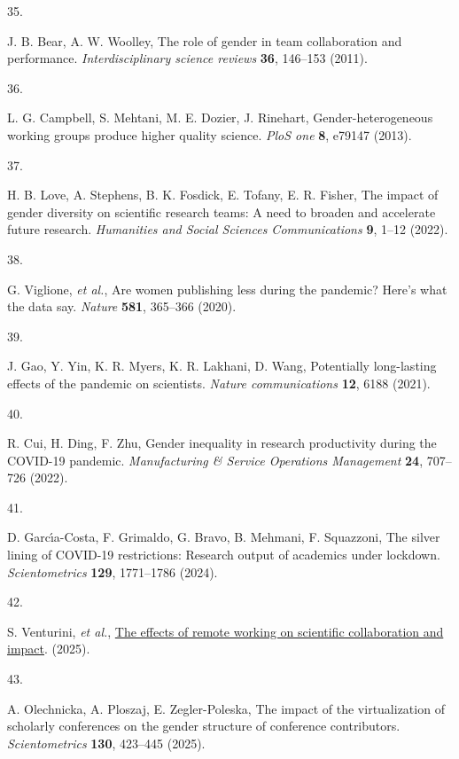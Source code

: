 \documentclass[
  11pt, %
]{article}
\newlength{\cslhangindent}
\newlength{\csllabelwidth}
\newenvironment{CSLReferences}[2] %
 {\begin{list}{}{%
  \setlength{\itemindent}{0pt}
  \setlength{\leftmargin}{0pt}
  \setlength{\parsep}{0pt}
  \ifodd #1
   \setlength{\leftmargin}{\cslhangindent}
   \setlength{\itemindent}{-1\cslhangindent}
  \fi
  \setlength{\itemsep}{#2\baselineskip}}}
 {\end{list}}
\newcommand{\CSLLeftMargin}[1]{\parbox[t]{\csllabelwidth}{\strut#1\strut}}
\newcommand{\CSLRightInline}[1]{\parbox[t]{\linewidth - \csllabelwidth}{\strut#1\strut}}
\begin{document}
\begin{CSLReferences}{0}{1}
\CSLLeftMargin{35. }%
\CSLRightInline{J. B. Bear, A. W. Woolley, The role of gender in team collaboration and performance. \emph{Interdisciplinary science reviews} \textbf{36}, 146--153 (2011).}

\CSLLeftMargin{36. }%
\CSLRightInline{L. G. Campbell, S. Mehtani, M. E. Dozier, J. Rinehart, Gender-heterogeneous working groups produce higher quality science. \emph{PloS one} \textbf{8}, e79147 (2013).}

\CSLLeftMargin{37. }%
\CSLRightInline{H. B. Love, A. Stephens, B. K. Fosdick, E. Tofany, E. R. Fisher, The impact of gender diversity on scientific research teams: A need to broaden and accelerate future research. \emph{Humanities and Social Sciences Communications} \textbf{9}, 1--12 (2022).}

\CSLLeftMargin{38. }%
\CSLRightInline{G. Viglione, \emph{et al.}, Are women publishing less during the pandemic? Here's what the data say. \emph{Nature} \textbf{581}, 365--366 (2020).}

\CSLLeftMargin{39. }%
\CSLRightInline{J. Gao, Y. Yin, K. R. Myers, K. R. Lakhani, D. Wang, Potentially long-lasting effects of the pandemic on scientists. \emph{Nature communications} \textbf{12}, 6188 (2021).}

\CSLLeftMargin{40. }%
\CSLRightInline{R. Cui, H. Ding, F. Zhu, Gender inequality in research productivity during the COVID-19 pandemic. \emph{Manufacturing \& Service Operations Management} \textbf{24}, 707--726 (2022).}

\CSLLeftMargin{41. }%
\CSLRightInline{D. Garcı́a-Costa, F. Grimaldo, G. Bravo, B. Mehmani, F. Squazzoni, The silver lining of COVID-19 restrictions: Research output of academics under lockdown. \emph{Scientometrics} \textbf{129}, 1771--1786 (2024).}

\CSLLeftMargin{42. }%
\CSLRightInline{S. Venturini, \emph{et al.}, \href{https://arxiv.org/abs/2511.18481}{The effects of remote working on scientific collaboration and impact}. (2025).}

\CSLLeftMargin{43. }%
\CSLRightInline{A. Olechnicka, A. Ploszaj, E. Zegler-Poleska, The impact of the virtualization of scholarly conferences on the gender structure of conference contributors. \emph{Scientometrics} \textbf{130}, 423--445 (2025).}


\end{CSLReferences}
\end{document}
